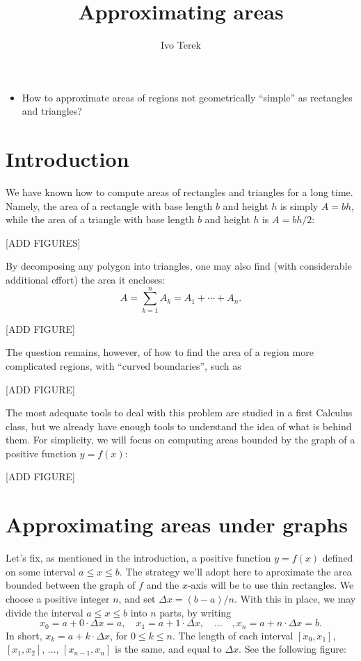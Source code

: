 \documentclass[nooutcomes]{ximera}
\author{Ivo Terek}
\title{Approximating areas}
\begin{document}
\begin{abstract}
  
\end{abstract}
\maketitle

\begin{motivatingQuestions}\begin{itemize}
	\item How to approximate areas of regions not geometrically ``simple'' as rectangles and triangles?
\end{itemize}\end{motivatingQuestions}

\section{Introduction}

We have known how to compute areas of rectangles and triangles for a long time. Namely, the area of a rectangle with base length $b$ and height $h$ is simply $A=bh$, while the area of a triangle with base length $b$ and height $h$ is $A = bh/2$:

[ADD FIGURES]

By decomposing any polygon into triangles, one may also find (with considerable additional effort) the area it encloses: $$A = \sum_{k=1}^n A_k = A_1+\cdots + A_n.$$

[ADD FIGURE]

The question remains, however, of how to find the area of a region more complicated regions, with ``curved boundaries'', such as

[ADD FIGURE]

The most adequate tools to deal with this problem are studied in a first Calculus class, but we already have enough tools to understand the idea of what is behind them. For simplicity, we will focus on computing areas bounded by the graph of a positive function $y=f(x)$:

[ADD FIGURE]

\section{Approximating areas under graphs}

Let's fix, as mentioned in the introduction, a positive function $y=f(x)$ defined on some interval $a \leq x \leq b$. The strategy we'll adopt here to aproximate the area bounded between the graph of $f$ and the $x$-axis will be to use thin rectangles. We choose a positive integer $n$, and set $\Delta x = (b-a)/n$. With this in place, we may divide the interval $a\leq x \leq b$ into $n$ parts, by writing $$x_0 = a+0\cdot \Delta x = a, \quad x_1 = a+1\cdot \Delta x,\quad \ldots\quad, x_n = a + n\cdot \Delta x = b.$$In short, $x_k = a+k\cdot \Delta x$, for $0\leq k \leq n$. The length of each interval $[x_0,x_1]$, $[x_1,x_2]$, ..., $[x_{n-1},x_n]$ is the same, and equal to $\Delta x$. See the following figure:
\end{document}
